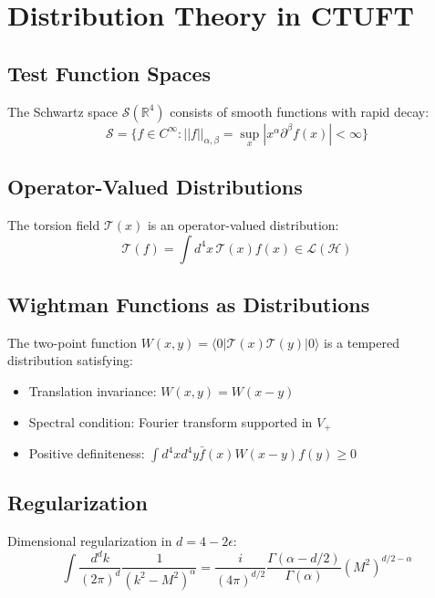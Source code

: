 \section{Distribution Theory in CTUFT}
\label{app:distribution}

\subsection{Test Function Spaces}

\begin{definition}
The Schwartz space $\mathcal{S}(\mathbb{R}^4)$ consists of smooth functions with rapid decay:
\begin{equation}
    \mathcal{S} = \{ f \in C^\infty : ||f||_{\alpha,\beta} = \sup_x |x^\alpha \partial^\beta f(x)| < \infty \}
\end{equation}
\end{definition}

\subsection{Operator-Valued Distributions}

The torsion field $\mathcal{T}(x)$ is an operator-valued distribution:
\begin{equation}
    \mathcal{T}(f) = \int d^4x \, \mathcal{T}(x) f(x) \in \mathcal{L}(\mathcal{H})
\end{equation}

\subsection{Wightman Functions as Distributions}

The two-point function $W(x,y) = \langle 0 | \mathcal{T}(x)\mathcal{T}(y) | 0 \rangle$ is a tempered distribution satisfying:
\begin{itemize}
    \item Translation invariance: $W(x,y) = W(x-y)$
    \item Spectral condition: Fourier transform supported in $V_+$
    \item Positive definiteness: $\int d^4x d^4y \bar{f}(x) W(x-y) f(y) \geq 0$
\end{itemize}

\subsection{Regularization}

Dimensional regularization in $d = 4 - 2\epsilon$:
\begin{equation}
    \int \frac{d^d k}{(2\pi)^d} \frac{1}{(k^2 - M^2)^\alpha} = \frac{i}{(4\pi)^{d/2}} \frac{\Gamma(\alpha - d/2)}{\Gamma(\alpha)} (M^2)^{d/2 - \alpha}
\end{equation}
